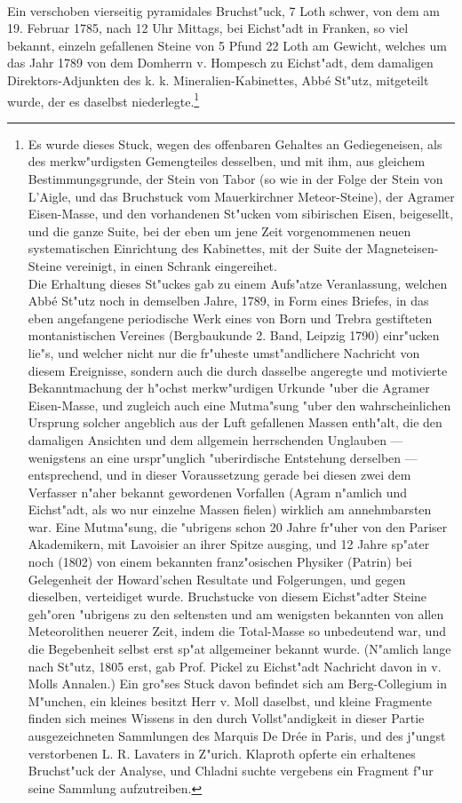 \documentclass[a4paper, 11pt, oneside, german]{article}
\begin{document}
\paragraph{}
Ein verschoben vierseitig pyramidales Bruchst"uck, 7 Loth schwer, von dem am 19. Februar 1785, nach 12 Uhr Mittags, bei Eichst"adt in Franken, so viel bekannt, einzeln gefallenen Steine von 5 Pfund 22 Loth am Gewicht, welches um das Jahr 1789 von dem Domherrn v. Hompesch zu Eichst"adt, dem damaligen Direktors-Adjunkten des k. k. Mineralien-Kabinettes, Abbé St"utz, mitgeteilt wurde, der es daselbst niederlegte.\footnote{Es wurde dieses Stuck, wegen des offenbaren Gehaltes an Gediegeneisen, als des merkw"urdigsten Gemengteiles desselben, und mit ihm, aus gleichem Bestimmungsgrunde, der Stein von Tabor (so wie in der Folge der Stein von L'Aigle, und das Bruchstuck vom Mauerkirchner Meteor-Steine), der Agramer Eisen-Masse, und den vorhandenen St"ucken vom sibirischen Eisen, beigesellt, und die ganze Suite, bei der eben um jene Zeit vorgenommenen neuen systematischen Einrichtung des Kabinettes, mit der Suite der Magneteisen-Steine vereinigt, in einen Schrank eingereihet.\\
Die Erhaltung dieses St"uckes gab zu einem Aufs"atze Veranlassung, welchen Abbé St"utz noch in demselben Jahre, 1789, in Form eines Briefes, in das eben angefangene periodische Werk eines von Born und Trebra gestifteten montanistischen Vereines (Bergbaukunde 2. Band, Leipzig 1790) einr"ucken lie"s, und welcher nicht nur die fr"uheste umst"andlichere Nachricht von diesem Ereignisse, sondern auch die durch dasselbe angeregte und motivierte Bekanntmachung der h"ochst merkw"urdigen Urkunde "uber die Agramer Eisen-Masse, und zugleich auch eine Mutma"sung "uber den wahrscheinlichen Ursprung solcher angeblich aus der Luft gefallenen Massen enth"alt, die den damaligen Ansichten und dem allgemein herrschenden Unglauben --- wenigstens an eine urspr"unglich "uberirdische Entstehung derselben --- entsprechend, und in dieser Voraussetzung gerade bei diesen zwei dem Verfasser n"aher bekannt gewordenen Vorfallen (Agram n"amlich und Eichst"adt, als wo nur einzelne Massen fielen) wirklich am annehmbarsten war. Eine Mutma"sung, die "ubrigens schon 20 Jahre fr"uher von den Pariser Akademikern, mit Lavoisier an ihrer Spitze ausging, und 12 Jahre sp"ater noch (1802) von einem bekannten franz"osischen Physiker (Patrin) bei Gelegenheit der Howard'schen Resultate und Folgerungen, und gegen dieselben, verteidiget wurde.  
Bruchstucke von diesem Eichst"adter Steine geh"oren "ubrigens zu den seltensten und am wenigsten bekannten von allen Meteorolithen neuerer Zeit, indem die Total-Masse so unbedeutend war, und die Begebenheit selbst erst sp"at allgemeiner bekannt wurde. (N"amlich lange nach St"utz, 1805 erst, gab Prof. Pickel zu Eichst"adt Nachricht davon in v. Molls Annalen.) Ein gro"ses Stuck davon befindet sich am Berg-Collegium in M"unchen, ein kleines besitzt Herr v. Moll daselbst, und kleine Fragmente finden sich meines Wissens in den durch Vollst"andigkeit in dieser Partie ausgezeichneten Sammlungen des Marquis De Drée in Paris, und des j"ungst verstorbenen L. R. Lavaters in Z"urich. Klaproth opferte ein erhaltenes Bruchst"uck der Analyse, und Chladni suchte vergebens ein Fragment f"ur seine Sammlung aufzutreiben.}
\end{document}
